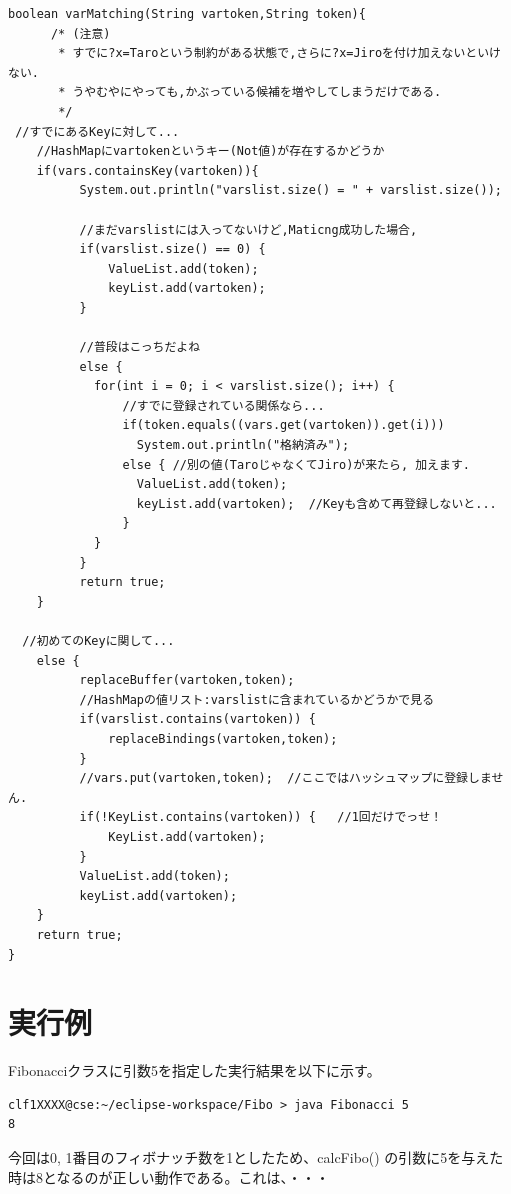 \documentclass[uplatex,12pt]{jsarticle}
\begin{document}
\begin{lstlisting}[caption=複数候補に対応したvarMatchingメソッド,label=src:No4]
boolean varMatching(String vartoken,String token){
	  /* (注意)
	   * すでに?x=Taroという制約がある状態で,さらに?x=Jiroを付け加えないといけない.
	   * うやむやにやっても,かぶっている候補を増やしてしまうだけである.
	   */
 //すでにあるKeyに対して...
    //HashMapにvartokenというキー(Not値)が存在するかどうか
    if(vars.containsKey(vartoken)){
    	  System.out.println("varslist.size() = " + varslist.size());

    	  //まだvarslistには入ってないけど,Maticng成功した場合,
    	  if(varslist.size() == 0) {
      		  ValueList.add(token);
      		  keyList.add(vartoken);
    	  }

    	  //普段はこっちだよね
    	  else {
    	  	for(int i = 0; i < varslist.size(); i++) {
    		    //すでに登録されている関係なら...
    		    if(token.equals((vars.get(vartoken)).get(i)))
    			  System.out.println("格納済み");
          	    else { //別の値(TaroじゃなくてJiro)が来たら, 加えます.
          		  ValueList.add(token);
          		  keyList.add(vartoken);  //Keyも含めて再登録しないと...
         	    }
    	  	}
    	  }
    	  return true;
    }

  //初めてのKeyに関して...
    else {
          replaceBuffer(vartoken,token);
          //HashMapの値リスト:varslistに含まれているかどうかで見る
          if(varslist.contains(vartoken)) {
              replaceBindings(vartoken,token);
          }
          //vars.put(vartoken,token);  //ここではハッシュマップに登録しません.
          if(!KeyList.contains(vartoken)) {   //1回だけでっせ！
        	  KeyList.add(vartoken);
          }
          ValueList.add(token);
          keyList.add(vartoken);
    }
    return true;
}
\end{lstlisting}



\section{実行例}
Fibonacciクラスに引数5を指定した実行結果を以下に示す。

\begin{lstlisting}
clf1XXXX@cse:~/eclipse-workspace/Fibo > java Fibonacci 5
8
\end{lstlisting}

今回は0, 1番目のフィボナッチ数を1としたため、calcFibo() の引数に5を与えた時は8となるのが正しい動作である。これは、・・・
\end{document}

